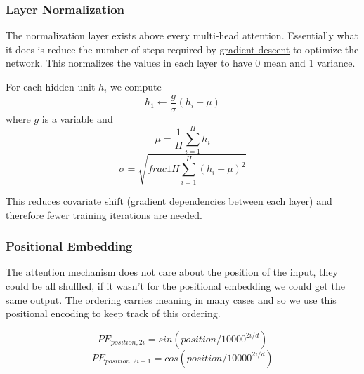 \documentclass[12pt]{article}
\begin{document}
        \subsubsection{Layer Normalization}
            The normalization layer exists above every multi-head attention. Essentially what it does is reduce the
            number of steps required by \hyperref[sec:GD]{gradient descent} to optimize the network. This normalizes the
            values in each layer to have 0 mean and 1 variance. 

            For each hidden unit $h_i$ we compute
            $$ h_1 \leftarrow \frac{g}{\sigma}(h_i - \mu)$$
            where $g$ is a variable and
            $$ \mu = \frac{1}{H} \sum_{i=1}^{H} h_i $$
            $$ \sigma = \sqrt{frac{1}{H} \sum_{i=1}^{H} (h_i-\mu)^2}$$

            This reduces covariate shift (gradient dependencies between each layer) and therefore fewer training
            iterations are needed.

        \subsubsection{Positional Embedding}
            The attention mechanism does not care about the position of the input, they could be all shuffled, if it
            wasn't for the positional embedding we could get the same output. The ordering carries meaning in many cases
            and so we use this positional encoding to keep track of this ordering.

            $$ PE_{position,2i} = sin(position/10000^{2i/d}) $$
            $$ PE_{position,2i+1} = cos(position/10000^{2i/d}) $$

\printindex
\end{document}
